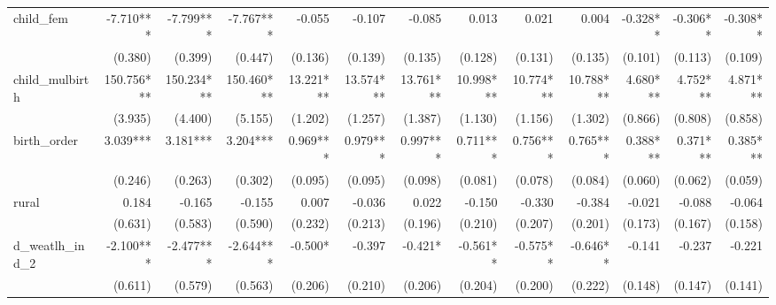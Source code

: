 \begin{tabular}{lrrrrrrrrrrrr}
child\_fem                                  &    -7.710*** &    -7.799*** &    -7.767*** &       -0.055 &       -0.107 &       -0.085 &        0.013 &        0.021 &        0.004 &     -0.328** &     -0.306** &     -0.308** \\ 
                                            &      (0.380) &      (0.399) &      (0.447) &      (0.136) &      (0.139) &      (0.135) &      (0.128) &      (0.131) &      (0.135) &      (0.101) &      (0.113) &      (0.109) \\ 
child\_mulbirth                             &   150.756*** &   150.234*** &   150.460*** &    13.221*** &    13.574*** &    13.761*** &    10.998*** &    10.774*** &    10.788*** &     4.680*** &     4.752*** &     4.871*** \\ 
                                            &      (3.935) &      (4.400) &      (5.155) &      (1.202) &      (1.257) &      (1.387) &      (1.130) &      (1.156) &      (1.302) &      (0.866) &      (0.808) &      (0.858) \\ 
birth\_order                                &     3.039*** &     3.181*** &     3.204*** &     0.969*** &     0.979*** &     0.997*** &     0.711*** &     0.756*** &     0.765*** &     0.388*** &     0.371*** &     0.385*** \\ 
                                            &      (0.246) &      (0.263) &      (0.302) &      (0.095) &      (0.095) &      (0.098) &      (0.081) &      (0.078) &      (0.084) &      (0.060) &      (0.062) &      (0.059) \\ 
rural                                       &        0.184 &       -0.165 &       -0.155 &        0.007 &       -0.036 &        0.022 &       -0.150 &       -0.330 &       -0.384 &       -0.021 &       -0.088 &       -0.064 \\ 
                                            &      (0.631) &      (0.583) &      (0.590) &      (0.232) &      (0.213) &      (0.196) &      (0.210) &      (0.207) &      (0.201) &      (0.173) &      (0.167) &      (0.158) \\ 
d\_weatlh\_ind\_2                           &    -2.100*** &    -2.477*** &    -2.644*** &      -0.500* &       -0.397 &      -0.421* &     -0.561** &     -0.575** &     -0.646** &       -0.141 &       -0.237 &       -0.221 \\ 
                                            &      (0.611) &      (0.579) &      (0.563) &      (0.206) &      (0.210) &      (0.206) &      (0.204) &      (0.200) &      (0.222) &      (0.148) &      (0.147) &      (0.141) \\ 

\end{tabular}
